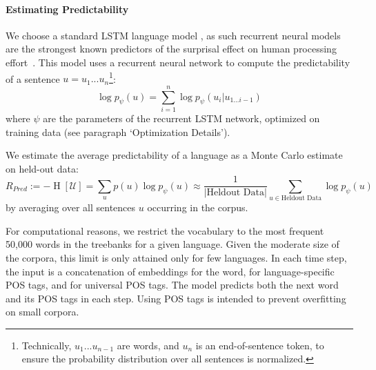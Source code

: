 \documentclass[10pt,twoside,lineno]{article}
\newcommand{\utterance}{\mathcal{U}}
\begin{document}
\paragraph{Estimating Predictability}
We choose a standard LSTM language model \citep{goldberg2017neural, hochreiter1997long}, as such recurrent neural models are the strongest known predictors of the surprisal effect on human processing effort~\cite{frank2011insensitivity,goodkind2018predictive}.
This model uses a recurrent neural network to compute the predictability of a sentence $u = u_1...u_n$\footnote{Technically, $u_1...u_{n-1}$ are words, and $u_n$ is an end-of-sentence token, to ensure the probability distribution over all sentences is normalized.}:
\begin{equation}
\log p_\psi(u) = \sum_{i=1}^n \log p_\psi(u_i|u_{1\dots i-1})
\end{equation}
where $\psi$ are the parameters of the recurrent LSTM network, optimized on training data (see paragraph `Optimization Details').


We estimate the average predictability of a language as a Monte Carlo estimate on held-out data:
\begin{equation}
	R_{Pred} := - \operatorname{H}[\utterance] = \sum_{u} p(u) \log p_\psi(u) \approx \frac{1}{|\text{Heldout Data}|} \sum_{u \in \text{Heldout Data}} \log p_\psi(u)
\end{equation}
by averaging over all sentences $u$ occurring in the corpus.


For computational reasons, we restrict the vocabulary to the most frequent 50,000 words in the treebanks for a given language.
Given the moderate size of the corpora, this limit is only attained only for few languages.
In each time step, the input is a concatenation of embeddings for the word, for language-specific POS tags, and for universal POS tags.
The model predicts both the next word and its POS tags in each step.
Using POS tags is intended to prevent overfitting on small corpora.
\end{document}

